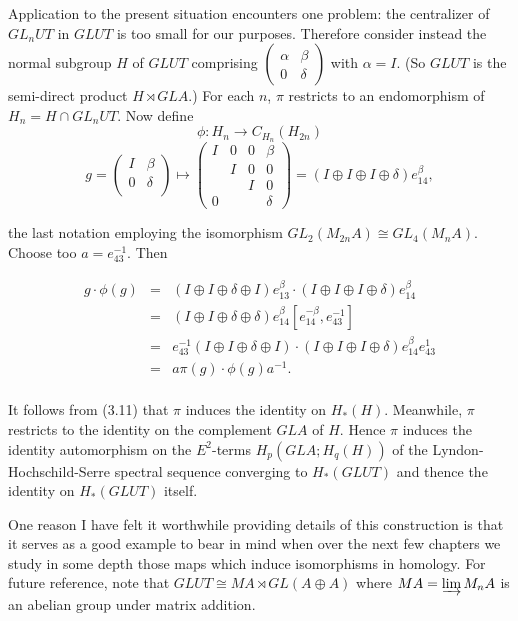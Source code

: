 Application to the present situation encounters one problem: the centralizer of $GL_nUT$ in $GLUT$ is too small for our purposes. Therefore consider instead the normal subgroup $H$ of $GLUT$ comprising $\begin{pmatrix}
  \alpha & \beta \\ 0 &\delta
\end{pmatrix}$ with $\alpha = I$. (So $GLUT$ is the semi-direct product $H \rtimes GLA$.) For each $n$, $\pi$ restricts to an endomorphism of $H_n = H\cap GL_nUT$. Now define
\[\phi\colon   H_n \longrightarrow C_{H_n}(H_{2n})\]
\[g=\begin{pmatrix}
  I & \beta \\ 0&\delta\\
\end{pmatrix} 
\mapsto 
\begin{pmatrix}
  I & 0 &0 &\beta \\ & I&0&0 \\ & & I&0 \\ 0& & &\delta
\end{pmatrix}=(I\oplus I\oplus I\oplus \delta)e_{14}^\beta ,\]

the last notation employing the isomorphism $GL_2(M_{2n}A) \cong GL_4(M_nA)$. Choose too $a = e_{43}^{-1}$. Then

\begin{equation*}
\begin{array}{rcl}
g \cdot \phi(g) & = & (I\oplus I\oplus \delta \oplus I) e_{13}^\beta \cdot (I\oplus I\oplus I \oplus \delta ) e_{14}^\beta \\
& =& (I\oplus I\oplus \delta \oplus \delta ) e_{14}^\beta [e_{14}^{-\beta},e_{43}^{-1}] \\
& = & e_{43}^{-1}(I\oplus I\oplus \delta \oplus I ) \cdot (I\oplus I\oplus I \oplus \delta )e_{14}^{\beta}e_{43}^{1} \\
& =&a\pi(g)\cdot \phi(g) a^{-1} .\\
\end{array}
\end{equation*}

It follows from (3.11) that $\pi$ induces the identity on $H_*(H)$. Meanwhile, $\pi$ restricts to the identity on the complement $GLA$ of $H$. Hence $\pi$ induces the identity automorphism on the $E^2$-terms $H_p(GLA; H_q(H))$ of the Lyndon-Hochschild-Serre spectral sequence converging to $H_*(GLUT)$ and thence the identity on $H_*(GLUT)$ itself.

One reason I have felt it worthwhile providing details of this construction is that it serves as a good example to bear in mind when over the next few chapters we study in some depth those  maps which induce isomorphisms in homology. For future reference, note that $GLUT \cong MA \rtimes GL(A \oplus A)$ where $MA = \varinjlim M_nA$ is an abelian group under matrix addition. 

